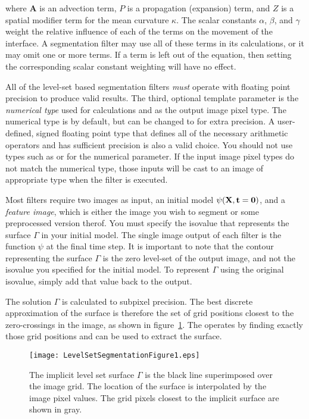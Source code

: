 where $\mathbf{A}$ is an advection term, $P$ is a propagation (expansion) term,
and $Z$ is a spatial modifier term for the mean curvature $\kappa$.  The scalar
constants $\alpha$, $\beta$, and $\gamma$ weight the relative influence of
each of the terms on the movement of the interface.  A segmentation filter may
use all of these terms in its calculations, or it may omit one or more terms.
If a term is left out of the equation, then setting the corresponding scalar
constant weighting will have no effect.

All of the level-set based segmentation filters \emph{must} operate with
floating point precision to produce valid results.  The third, optional
template parameter is the \emph{numerical type} used for calculations and as
the output image pixel type.  The numerical type is  by default,
but can be changed to  for extra precision.  A user-defined,
signed floating point type that defines all of the necessary arithmetic
operators and has sufficient precision is also a valid choice.  You should not
use types such as  or  for the numerical
parameter.  If the input image pixel types do not match the numerical type,
those inputs will be cast to an image of appropriate type when the filter is
executed.

Most filters require two images as input, an initial model $\psi(\bf{X}, t=0)$,
and a \emph{feature image}, which is either the image you wish to segment or
some preprocessed version therof.  You must specify the isovalue that
represents the surface $\Gamma$ in your initial model. The single image output of
each filter is the function $\psi$ at the final time step.  It is important to
note that the contour representing the surface $\Gamma$ is the zero level-set
of the output image, and not the isovalue you specified for the initial model.
To represent $\Gamma$ using the original isovalue, simply add that value back
to the output.

The solution $\Gamma$ is calculated to subpixel precision.  The best discrete
approximation of the surface is therefore the set of grid positions closest to
the zero-crossings in the image, as shown in
figure~\ref{fig:LevelSetSegmentationFigure1}.  The
 operates by finding exactly those grid 
positions and can be used to extract the surface. 

\begin{figure}
\centering
\texttt{[image: LevelSetSegmentationFigure1.eps]}
\caption[Grid position of the embedded level-set surface.]{The implicit level
set surface $\Gamma$ is the black line superimposed over the image grid.  The location
of the surface is interpolated by the image pixel values.  The grid pixels
closest to the implicit surface are shown in gray. }
\protect\label{fig:LevelSetSegmentationFigure1}
\end{figure}

